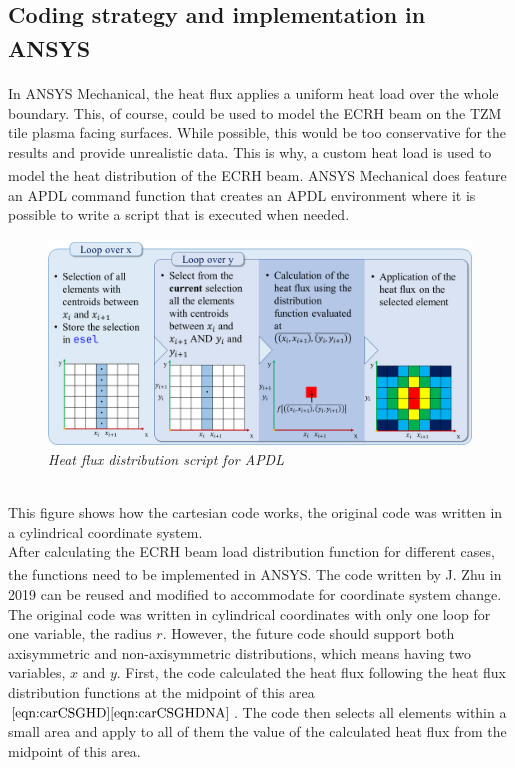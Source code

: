 \subsection{Coding strategy and implementation in ANSYS\textsuperscript{\textregistered}}
\normalsize{In ANSYS\textsuperscript{\textregistered} Mechanical, the heat flux applies a uniform heat load over the whole boundary. This, of course, could be used to model the \acrshort{ECRH} beam on the TZM tile plasma facing surfaces. While possible, this would be too conservative for the results and provide unrealistic data. This is why, a custom heat load is used to model the heat distribution of the \acrshort{ECRH} beam. ANSYS\textsuperscript{\textregistered} Mechanical does feature an APDL command function that creates an APDL environment where it is possible to write a script that is executed when needed.}
\\
\begin{figure}[h!]
    \centering
    \includegraphics[width=1\textwidth]{figures/apdlscript5.png}
    \caption{\it Heat flux distribution script for APDL}
    \label{fig:fig_4_4_2_1}
\end{figure}
\\
\break
\normalsize{This figure shows how the cartesian code works, the original code was written in a cylindrical coordinate system.}
\\
\break
\normalsize{\indent After calculating the \acrshort{ECRH} beam load distribution function for different cases, the functions need to be implemented in ANSYS\textsuperscript{\textregistered}. The code written by J. Zhu \cites{zhu_parametric_2019} in 2019 can be reused and modified to accommodate for coordinate system change. The original code was written in cylindrical coordinates with only one loop for one variable, the radius $r$. However, the future code should support both axisymmetric and non-axisymmetric distributions, which means having two variables, $x$ and $y$. First, the code calculated the heat flux following the heat flux distribution functions at the midpoint of this area $\eqref{eqn:carCSGHD} \eqref{eqn:carCSGHDNA}$. The code then selects all elements within a small area and apply to all of them the value of the calculated heat flux from the midpoint of this area.}
